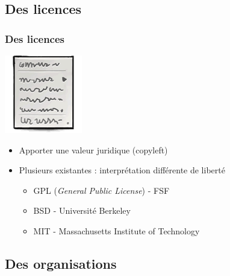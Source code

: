 \documentclass[english]{beamer}
\begin{document}
\subsection{Des licences}

\begin{frame}
  \frametitle{Des licences}
  \vspace{-2em}
  \begin{center}
    \includegraphics[scale=0.6]{licence.png}
  \end{center}
  \vspace{-1em}
  \begin{itemize}
  \item <2-> Apporter une valeur juridique (copyleft)
  \item <3-> Plusieurs existantes : interprétation différente de liberté
    \begin{itemize}
    \item <4-> GPL (\textit{General Public License}) - FSF
    \item <5-> BSD - Université Berkeley
    \item <6-> MIT - Massachusetts Institute of Technology
    \end{itemize}
  \end{itemize}

\end{frame}

\subsection{Des organisations}
\end{document}
